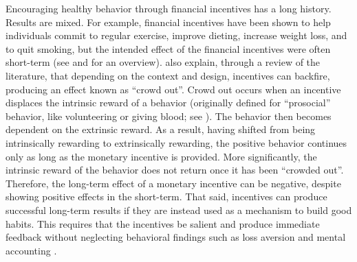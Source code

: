 \documentclass[12pt,letterpaperpaper,]{book}
\begin{document}
Encouraging healthy behavior through financial incentives has a long
history. Results are mixed. For example, financial incentives have been
shown to help individuals commit to regular exercise, improve dieting,
increase weight loss, and to quit smoking, but the intended effect of
the financial incentives were often short-term (see
\citet{gneezy_when_2011} and \citet{cawley_economy_2015} for an
overview). \citet{gneezy_when_2011} also explain, through a review of
the literature, that depending on the context and design, incentives can
backfire, producing an effect known as ``crowd out''. Crowd out occurs
when an incentive displaces the intrinsic reward of a behavior
(originally defined for ``prosocial'' behavior, like volunteering or
giving blood; see \citet{benabou_incentives_2006}). The behavior then
becomes dependent on the extrinsic reward. As a result, having shifted
from being intrinsically rewarding to extrinsically rewarding, the
positive behavior continues only as long as the monetary incentive is
provided. More significantly, the intrinsic reward of the behavior does
not return once it has been ``crowded out''. Therefore, the long-term
effect of a monetary incentive can be negative, despite showing positive
effects in the short-term. That said, incentives can produce successful
long-term results if they are instead used as a mechanism to build good
habits. This requires that the incentives be salient and produce
immediate feedback without neglecting behavioral findings such as loss
aversion and mental accounting \citep{john_financial_2011}.
\end{document}
